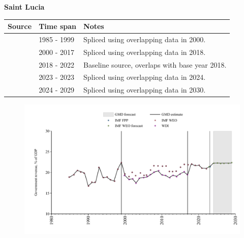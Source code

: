 \documentclass[12pt,a4paper,landscape]{article}
\begin{document}
\begin{adjustbox}{max totalsize={\paperwidth}{\paperheight},center}
\begin{minipage}[t][\textheight][t]{\textwidth}
\vspace*{0.5cm}
{}
\begin{center}
{\Large\bfseries Saint Lucia}
\end{center}
\vspace{0.5cm}
\begin{table}[H]
\centering
\small
\begin{tabular}{|l|l|l|}
\hline
\textbf{Source} & \textbf{Time span} & \textbf{Notes} \\
\hline
\rowcolor{white}\cite{IMF_WEO}& 1985 - 1999 &Spliced using overlapping data in 2000.\\
\rowcolor{lightgray}\cite{WDI}& 2000 - 2017 &Spliced using overlapping data in 2018.\\
\rowcolor{white}\cite{IMF_WEO}& 2018 - 2022 &Baseline source, overlaps with base year 2018.\\
\rowcolor{lightgray}\cite{IMF_FPP}& 2023 - 2023 &Spliced using overlapping data in 2024.\\
\rowcolor{white}\cite{IMF_WEO_forecast}& 2024 - 2029 &Spliced using overlapping data in 2030.\\
\hline
\end{tabular}
\end{table}
\begin{figure}[H]
\centering
\includegraphics[width=\textwidth,height=0.6\textheight,keepaspectratio]{graphs/LCA_govrev_GDP.pdf}
\end{figure}
\end{minipage}
\end{adjustbox}
\end{document}

